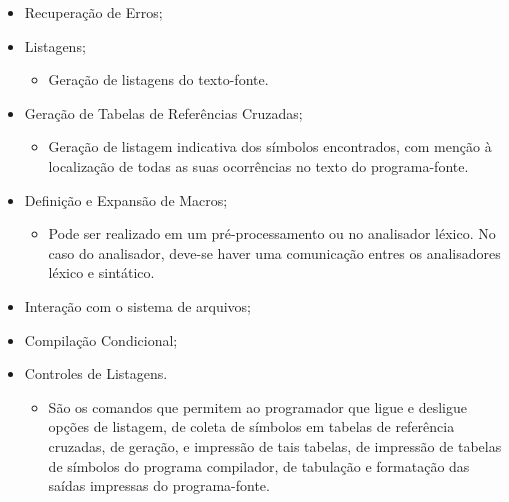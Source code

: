 \begin{itemize}
	\item Recuperação de Erros;
	
	\item Listagens;
	\begin{itemize}
		\item Geração de listagens do texto-fonte.
	\end{itemize}
	
	\item Geração de Tabelas de Referências Cruzadas;
	\begin{itemize}
		\item Geração de listagem indicativa dos símbolos encontrados, com menção à localização de todas as suas ocorrências no texto do programa-fonte.
	\end{itemize}
	
	\item Definição e Expansão de Macros;
	\begin{itemize}
		\item Pode ser realizado em um pré-processamento ou no analisador léxico. No caso do analisador, deve-se haver uma comunicação entres os analisadores léxico e sintático.
	\end{itemize}
	
	\item Interação com o sistema de arquivos;
	
	\item Compilação Condicional;
	
	\item Controles de Listagens.
	\begin{itemize}
		\item São os comandos que permitem ao programador que ligue e desligue opções de listagem, de coleta de símbolos em tabelas de referência cruzadas, de geração, e impressão de tais tabelas, de impressão de tabelas de símbolos do programa compilador, de tabulação e formatação das saídas impressas do programa-fonte.
	\end{itemize}

\end{itemize}